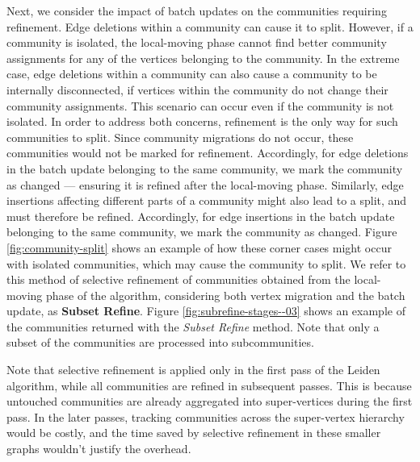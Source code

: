 Next, we consider the impact of batch updates on the communities requiring refinement. Edge deletions within a community can cause it to split. However, if a community is isolated, the local-moving phase cannot find better community assignments for any of the vertices belonging to the community. In the extreme case, edge deletions within a community can also cause a community to be internally disconnected, if vertices within the community do not change their community assignments. This scenario can occur even if the community is not isolated. In order to address both concerns, refinement is the only way for such communities to split. Since community migrations do not occur, these communities would not be marked for refinement. Accordingly, for edge deletions in the batch update belonging to the same community, we mark the community as changed --- ensuring it is refined after the local-moving phase. Similarly, edge insertions affecting different parts of a community might also lead to a split, and must therefore be refined. Accordingly, for edge insertions in the batch update belonging to the same community, we mark the community as changed. Figure \ref{fig:community-split} shows an example of how these corner cases might occur with isolated communities, which may cause the community to split. We refer to this method of selective refinement of communities obtained from the local-moving phase of the algorithm, considering both vertex migration and the batch update, as \textbf{Subset Refine}. Figure \ref{fig:subrefine-stages--03} shows an example of the communities returned with the \textit{Subset Refine} method. Note that only a subset of the communities are processed into subcommunities.

Note that selective refinement is applied only in the first pass of the Leiden algorithm, while all communities are refined in subsequent passes. This is because untouched communities are already aggregated into super-vertices during the first pass. In the later passes, tracking communities across the super-vertex hierarchy would be costly, and the time saved by selective refinement in these smaller graphs wouldn't justify the overhead.

